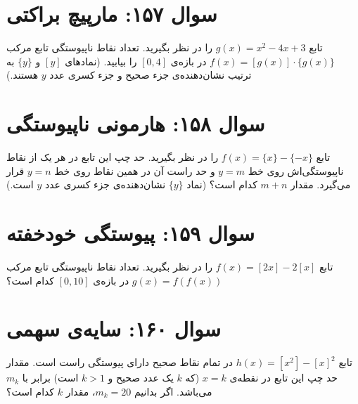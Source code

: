 \documentclass[12pt]{article}
\begin{document}
\section*{سوال ۱۵۷: مارپیچ براکتی}
تابع \( g(x) = x^2 - 4x + 3 \) را در نظر بگیرید. تعداد نقاط ناپیوستگی تابع مرکب \( f(x) = [g(x)] \cdot \{g(x)\} \) در بازه‌ی \( [0, 4] \) را بیابید.
(نمادهای \( [y] \) و \( \{y\} \) به ترتیب نشان‌دهنده‌ی جزء صحیح و جزء کسری عدد \(y\) هستند.)

\vspace{1cm}
\hrulefill
\vspace{1cm}

\section*{سوال ۱۵۸: هارمونی ناپیوستگی}
تابع \( f(x) = \{x\} - \{-x\} \) را در نظر بگیرید. حد چپ این تابع در هر یک از نقاط ناپیوستگی‌اش روی خط \(y=m\) و حد راست آن در همین نقاط روی خط \(y=n\) قرار می‌گیرد. مقدار \(m+n\) کدام است؟
(نماد \( \{y\} \) نشان‌دهنده‌ی جزء کسری عدد \(y\) است.)

\vspace{1cm}
\hrulefill
\vspace{1cm}

\section*{سوال ۱۵۹: پیوستگی خودخفته}
تابع \( f(x) = [2x] - 2[x] \) را در نظر بگیرید. تعداد نقاط ناپیوستگی تابع مرکب \( g(x) = f(f(x)) \) در بازه‌ی \( [0, 10] \) کدام است؟

\vspace{1cm}
\hrulefill
\vspace{1cm}

\section*{سوال ۱۶۰: سایه‌ی سهمی}
تابع \( h(x) = [x^2] - [x]^2 \) در تمام نقاط صحیح دارای پیوستگی راست است. مقدار حد چپ این تابع در نقطه‌ی \(x=k\) (که \(k\) یک عدد صحیح و \(k>1\) است) برابر با \(m_k\) می‌باشد. اگر بدانیم \(m_k = 20\)، مقدار \(k\) کدام است؟
\end{document}
